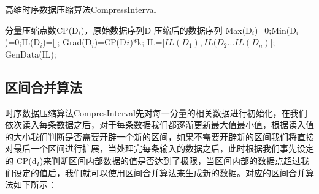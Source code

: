 \begin{algorithm}
\caption{高维时序数据压缩算法CompressInterval}
\label{alg1}
\begin{algorithmic}[1]
\REQUIRE 分量压缩点数CP(D$_{i}$)，原始数据序列D 
\ENSURE 压缩后的数据序列
\STATE Max(D$_{i}$)=0;Min(D$_{i}$)=0;IL(D$_{i}$)=[];
\STATE Grad(D$_{i}$)=CP(D$_{}i$)*k;
\ENDFOR
{}
\ENDWHILE
\STATE IL=[$ IL(D_{1}),IL(D_{2}...IL(D_{n}) $];
\RETURN GenData(IL);
\end{algorithmic}
\end{algorithm}


\subsection{区间合并算法}
\label{section 4.15}
时序数据压缩算法CompresInterval先对每一分量的相关数据进行初始化，在我们依次读入每条数据之后，对于每条数据我们都逐渐更新最大值最小值，根据读入值
的大小我们判断是否需要开辟一个新的区间，如果不需要开辟新的区间我们将直接对最后一个区间进行扩展，当处理完每条输入的数据之后，此时根据我们事先设定的
CP(d$_{I}$)来判断区间内部数据的值是否达到了极限，当区间内部的数据点超过我们设定的值后，我们就可以使用区间合并算法来生成新的数据。对应的区间合并算法如下所示：

